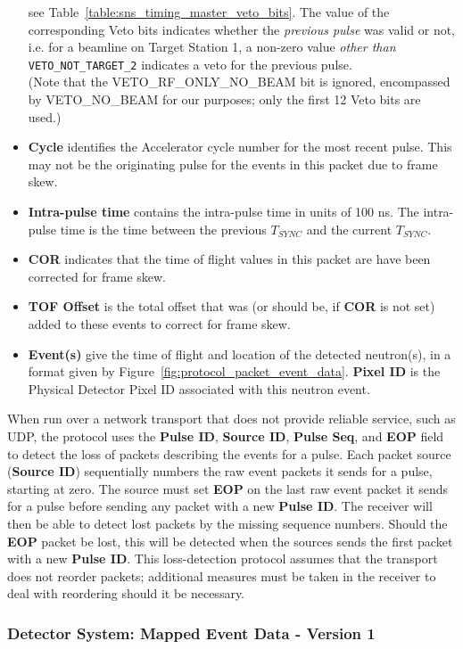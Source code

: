 \begin{itemize}
see Table~\ref{table:sns_timing_master_veto_bits}.
The value of the corresponding Veto bits indicates whether the
{\it previous pulse} was valid or not,
i.e. for a beamline on Target Station 1,
a non-zero value {\it other than } {\tt VETO\_NOT\_TARGET\_2}
indicates a veto for the previous pulse. \\
(Note that the VETO\_RF\_ONLY\_NO\_BEAM bit is ignored,
encompassed by VETO\_NO\_BEAM for our purposes;
only the first 12 Veto bits are used.)
\item{\bf Cycle} identifies the Accelerator cycle number for the most
recent pulse. This may not be the originating pulse for the events in this
packet due to frame skew.
\item{\bf Intra-pulse time} contains the intra-pulse time in units of 100 ns.
The intra-pulse time is the time between the previous $T_{SYNC}$ and the
current $T_{SYNC}$.
\item{\bf COR} indicates that the time of flight values in this packet are
have been corrected for frame skew.
\item{\bf TOF Offset} is the total offset that was (or should be, if {\bf COR}
is not set) added to these events to correct for frame skew.
\item{\bf Event(s)} give the time of flight and location of the detected
neutron(s), in a format given by Figure~\ref{fig:protocol_packet_event_data}.
{\bf Pixel ID} is the Physical Detector Pixel ID
associated with this neutron event.
\end{itemize}

When run over a network transport that does not provide reliable service, such
as UDP, the protocol uses the {\bf Pulse ID}, {\bf Source ID}, {\bf Pulse Seq},
and {\bf EOP} field to detect the loss of packets describing the events for a
pulse. Each packet source ({\bf Source ID}) sequentially numbers the raw event
packets it sends for a pulse, starting at zero. The source must set {\bf EOP}
on the last raw event packet it sends for a pulse before sending any packet
with a new {\bf Pulse ID}. The receiver will then be able to detect lost
packets by the missing sequence numbers. Should the {\bf EOP} packet be lost,
this will be detected when the sources sends the first packet with a new {\bf
Pulse ID}. This loss-detection protocol assumes that the transport does not
reorder packets; additional measures must be taken in the receiver
to deal with reordering should it be necessary.


\newpage
\subsubsection{Detector System: Mapped Event Data - Version 1}
\label{section:protocol_mapped_event_packet_v1}

